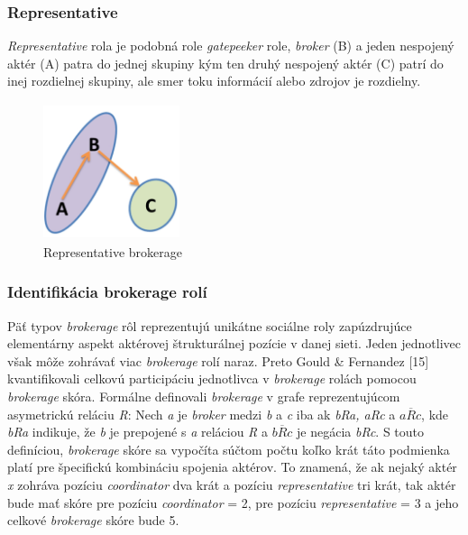 \documentclass[slovak,master,public,dept460,male,cpdeclaration,oneside]{diploma}
\begin{document}
\subsubsection{Representative}
\textit{Representative} rola je podobná role \textit{gatepeeker} role, \textit{broker} (B) a jeden nespojený aktér (A) patra do jednej skupiny kým ten druhý nespojený aktér (C) patrí do inej rozdielnej skupiny, ale  smer toku informácií alebo zdrojov je rozdielny. 


\begin{figure}[H]
\centering
\includegraphics[width=4cm, height=4cm]{figures/representative}
\caption{Representative brokerage}
\end{figure}

\subsubsection{Identifikácia brokerage rolí}
Päť typov \textit{brokerage} rôl  reprezentujú unikátne sociálne roly zapúzdrujúce elementárny aspekt aktérovej štrukturálnej pozície v danej sieti. Jeden jednotlivec však môže zohrávať viac \textit{brokerage} rolí naraz. Preto Gould \& Fernandez [15] kvantifikovali celkovú participáciu jednotlivca v \textit{brokerage} rolách pomocou \textit{brokerage} skóra. Formálne definovali \textit{brokerage} v grafe reprezentujúcom asymetrickú reláciu \textit{R}: Nech \textit{a} je \textit{broker} medzi \textit{b} a \textit{c} iba ak \textit{bRa, aRc} a   ${ a\overline{R}c }$, kde \textit{bRa} indikuje, že \textit{b} je prepojené s \textit{a} reláciou \textit{R} a ${ b\overline{R}c }$
je negácia \textit{bRc}. S touto definíciou, \textit{brokerage} skóre sa vypočíta súčtom počtu koľko krát táto podmienka platí pre špecifickú kombináciu spojenia aktérov. To znamená, že ak nejaký aktér \textit{x} zohráva pozíciu \textit{coordinator} dva krát a pozíciu \textit{representative} tri krát, tak aktér bude mať skóre pre pozíciu \textit{coordinator} = 2, pre pozíciu  \textit{representative} = 3 a jeho celkové \textit{brokerage} skóre bude 5.
\end{document}
